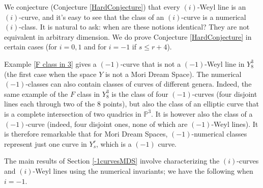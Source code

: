 \documentclass[12pt]{article}
\newtheorem{theorem}[equation]{Theorem}
\newtheorem{lemma}[equation]{Lemma}
\numberwithin{equation}{section}
\numberwithin{subeq}{equation}
\def\bbP{\mathbb{P}}
\begin{document}
We conjecture (Conjecture \ref{HardConjecture}) that 
every $(i)$-Weyl line is an $(i)$-curve,
and it's easy to see that the class of an $(i)$-curve is a numerical $(i)$-class.
It is natural to ask: when are these notions identical?
They are not equivalent in arbitrary dimension.
We do prove Conjecture \ref{HardConjecture}
in certain cases (for $i = 0, 1$ and for $i=-1$ if $s \leq r+4$).

Example \eqref{F class in 3} gives a $(-1)$-curve
that is not a $(-1)$-Weyl line in $Y^3_8$
(the first case when the space $Y$ is not a Mori Dream Space).
The numerical $(-1)$-classes can also contain classes of curves of different genera.
Indeed, the same example of the $F$ class in $Y^3_8$
is the class of four $(-1)$-curves (four disjoint lines each through two of the $8$ points),
but also the class of an elliptic curve that is a complete intersection
of two quadrics in $\bbP^3$.
It is however also the class of a $(-1)$-curve
(indeed, four disjoint ones,
none of which are $(-1)$-Weyl lines).
It is therefore remarkable that for Mori Dream Spaces,
$(-1)$-numerical classes represent just one curve in $Y^r_s$,
which is a $(-1)$ curve.

The main results of Section \ref{-1curvesMDS} involve characterizing the $(i)$-curves
and $(i)$-Weyl lines using the numerical invariants; we have the following when $i=-1$.

\end{document}
